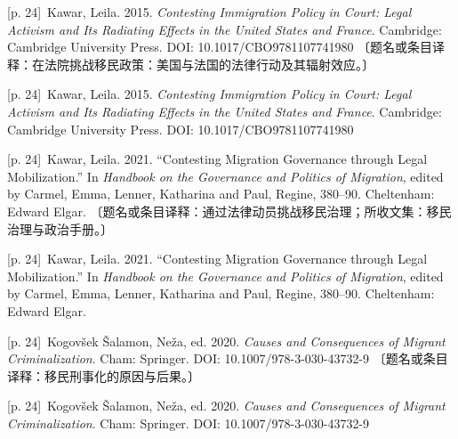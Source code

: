 \documentclass[10pt,a4paper]{article}
\begin{document}
\noindent\begin{minipage}{\textwidth}\begin{minipage}[t]{\dimexpr.5\textwidth-4mm\relax}{\scriptsize\color{gray} [p. 24]}\ Kawar, Leila. 2015. \textit{Contesting Immigration Policy in Court: Legal Activism and Its Radiating Effects in the United States and France}. Cambridge: Cambridge University Press. DOI: 10.1017/CBO9781107741980 〔题名或条目译释：在法院挑战移民政策：美国与法国的法律行动及其辐射效应。〕\par\end{minipage}\hfill\begin{minipage}[t]{\dimexpr.5\textwidth-4mm\relax}{\scriptsize\color{gray} [p. 24]}\ Kawar, Leila. 2015. \textit{Contesting Immigration Policy in Court: Legal Activism and Its Radiating Effects in the United States and France}. Cambridge: Cambridge University Press. DOI: 10.1017/CBO9781107741980\par\end{minipage}\end{minipage}\par
\noindent\begin{minipage}{\textwidth}\begin{minipage}[t]{\dimexpr.5\textwidth-4mm\relax}{\scriptsize\color{gray} [p. 24]}\ Kawar, Leila. 2021. “Contesting Migration Governance through Legal Mobilization.” In \textit{Handbook on the Governance and Politics of Migration}, edited by Carmel, Emma, Lenner, Katharina and Paul, Regine, 380–90. Cheltenham: Edward Elgar. 〔题名或条目译释：通过法律动员挑战移民治理；所收文集：移民治理与政治手册。〕\par\end{minipage}\hfill\begin{minipage}[t]{\dimexpr.5\textwidth-4mm\relax}{\scriptsize\color{gray} [p. 24]}\ Kawar, Leila. 2021. “Contesting Migration Governance through Legal Mobilization.” In \textit{Handbook on the Governance and Politics of Migration}, edited by Carmel, Emma, Lenner, Katharina and Paul, Regine, 380–90. Cheltenham: Edward Elgar.\par\end{minipage}\end{minipage}\par
\noindent\begin{minipage}{\textwidth}\begin{minipage}[t]{\dimexpr.5\textwidth-4mm\relax}{\scriptsize\color{gray} [p. 24]}\ Kogovšek Šalamon, Neža, ed. 2020. \textit{Causes and Consequences of Migrant Criminalization}. Cham: Springer. DOI: 10.1007/978-3-030-43732-9 〔题名或条目译释：移民刑事化的原因与后果。〕\par\end{minipage}\hfill\begin{minipage}[t]{\dimexpr.5\textwidth-4mm\relax}{\scriptsize\color{gray} [p. 24]}\ Kogovšek Šalamon, Neža, ed. 2020. \textit{Causes and Consequences of Migrant Criminalization}. Cham: Springer. DOI: 10.1007/978-3-030-43732-9\par\end{minipage}\end{minipage}\par
\end{document}
